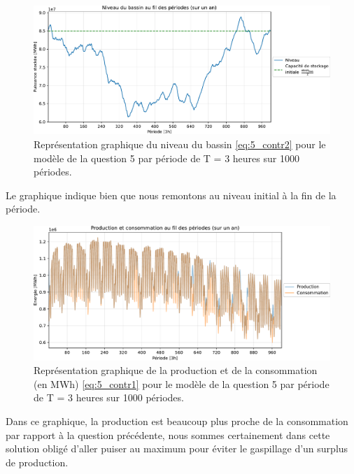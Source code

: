 \documentclass{article}
\begin{document}
\begin{figure}[h!]
    \centering
    \includegraphics[scale=0.6]{GraphesP2/Niveau_Bassin_Q5.pdf}
    \caption{Représentation graphique du niveau du bassin \eqref{eq:5_contr2} pour le modèle 
    de la question 5 par période de T = 3 heures sur 1000 périodes.}
    \label{fig:Niveau_bassin_Q5}
\end{figure}
Le graphique indique bien que nous remontons au niveau initial à la fin de la période.
\newpage
\begin{figure}[h!]
    \centering
    \includegraphics[scale=0.6]{GraphesP2/Prod_Cons_Q5.pdf}
    \caption{Représentation graphique de la production et de la consommation (en MWh) 
    \eqref{eq:5_contr1} pour le modèle de la question 5 par période de T = 3 heures sur 1000 périodes.}
    \label{fig:Prod_Cons_Q5}
\end{figure}
Dans ce graphique, la production est beaucoup plus proche de la consommation par rapport à la question précédente, nous sommes certainement dans cette solution
obligé d'aller puiser au maximum pour éviter le gaspillage d'un surplus de production.
\noindent 
\end{document}
